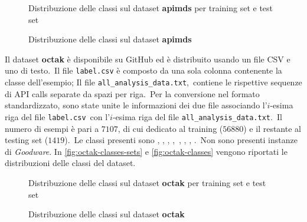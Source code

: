 \begin{figure}[h!]
    \centering
    \caption{Distribuzione delle classi sul dataset \textbf{apimds} per training set e test set}
    \label{fig:apimds-classes-sets}
\end{figure}


\begin{figure}[h!]
    \centering
    \caption{Distribuzione delle classi sul dataset \textbf{apimds}}
    \label{fig:apimds-classes}
\end{figure}

\FloatBarrier

Il dataset \textbf{octak} è disponibile su GitHub ed è distribuito usando un file CSV e uno di testo.\
Il file \texttt{label.csv} è composto da una sola colonna contenente la classe dell'esempio; Il file \texttt{all\_analysis\_data.txt},\
contiene le rispettive sequenze di API calls separate da spazi per riga.\
Per la conversione nel formato standardizzato, sono state unite le informazioni dei due file associando l'$i$-esima riga del file \texttt{label.csv}\
con l'$i$-esima riga del file \texttt{all\_analysis\_data.txt}.\
Il numero di esempi è pari a $7107$, di cui  dedicato al training ($56880$) e il restante  al testing set ($1419$).\
Le classi presenti sono , , , ,\
, , , .\
Non sono presenti instanze di \textit{Goodware}.
In \autoref{fig:octak-classes-sets} e \autoref{fig:octak-classes} vengono riportati le distribuzioni delle classi del dataset.

\begin{figure}[h!]
    \centering
    \caption{Distribuzione delle classi sul dataset \textbf{octak} per training set e test set}
    \label{fig:octak-classes-sets}
\end{figure}

\begin{figure}[h!]
    \centering
    \adjustbox{max width=\linewidth, max height=\textheight}{%
    }
    \caption{Distribuzione delle classi sul dataset \textbf{octak}}
    \label{fig:octak-classes}
\end{figure}

